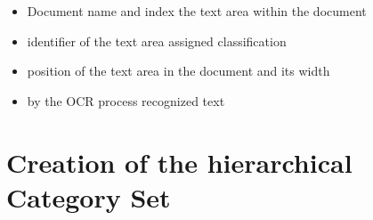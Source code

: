 \documentclass[11pt,a4paper]{article}
\begin{document}

\begin{itemize}
\setlength{\itemsep}{-5pt}
 \item Document name and index the text area within the document
 \item identifier of the text area assigned classification
 \item position of the text area in the document and its width
 \item by the OCR process recognized text
\end{itemize}

\begin{comment}
\begin{itemize}
\setlength{\itemsep}{-5pt}
 \item Dokumentenname und Index des Textbereiches innerhalb des Dokumentes
 \item Kennung der dem Textbereich zugewiesenen Klassifikation
 \item Position des Textbereiches im Dokument und seine Breite
 \item der vom OCR-Prozess erkannte Inhalt
\end{itemize}
\end{comment}

\section{Creation of the hierarchical Category Set}
 \label{sec:Creation of the hierarchical Category Set}
\end{document}
